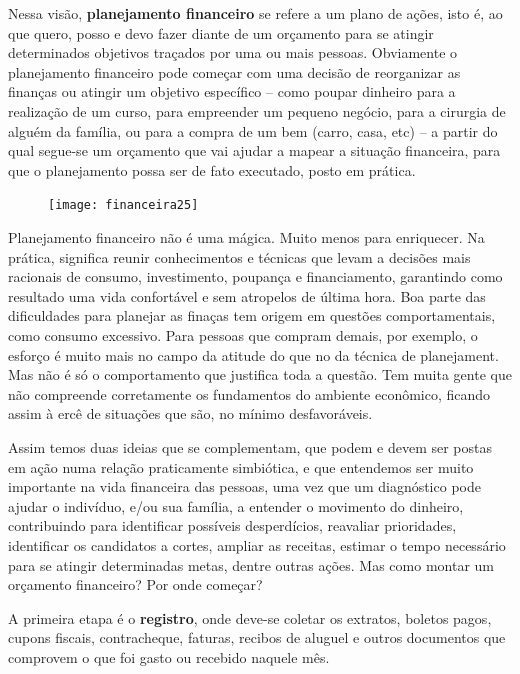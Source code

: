 Nessa visão, \textbf{planejamento financeiro} se refere a um plano de ações, isto é, ao que quero, posso e devo fazer diante de um orçamento para se atingir determinados objetivos traçados por uma ou mais pessoas. Obviamente o planejamento financeiro pode começar com uma decisão de reorganizar as finanças ou atingir um objetivo específico – como poupar dinheiro para a realização de um curso, para empreender um pequeno negócio, para a cirurgia de alguém da família, ou para a compra de um bem (carro, casa, etc) – a partir do qual segue-se um orçamento que vai ajudar a mapear a situação financeira, para que o planejamento possa ser de fato executado, posto em prática.

\begin{knowledge}
\begin{figure}
\texttt{[image: financeira25]}
\end{figure}

Planejamento financeiro não é uma mágica. Muito menos para enriquecer. Na prática, significa reunir conhecimentos e técnicas que levam a decisões mais racionais de consumo, investimento, poupança e financiamento, garantindo como resultado uma vida confortável e sem atropelos de última hora. Boa parte das dificuldades para planejar as finaças tem origem em questões comportamentais, como consumo excessivo. Para pessoas que compram demais, por exemplo, o esforço é muito mais no campo da atitude do que no da técnica de planejament. Mas não é só o comportamento que justifica toda a questão. Tem muita gente que não compreende corretamente os fundamentos do ambiente econômico, ficando assim à ercê de situações que são, no mínimo desfavoráveis.
\end{knowledge}


Assim temos duas ideias que se complementam, que podem e devem ser postas em ação numa relação praticamente simbiótica, e que entendemos ser muito importante na vida financeira das pessoas, uma vez que um diagnóstico pode ajudar o indivíduo, e/ou sua família, a entender o movimento do dinheiro, contribuindo para identificar possíveis desperdícios, reavaliar prioridades, identificar os candidatos a cortes, ampliar as receitas, estimar o tempo necessário para se atingir determinadas metas, dentre outras ações. Mas como montar um orçamento financeiro? Por onde começar?

A primeira etapa é o \textbf{registro}, onde deve-se coletar os extratos, boletos pagos, cupons fiscais, contracheque, faturas, recibos de aluguel e outros documentos que comprovem o que foi gasto ou recebido naquele mês.

